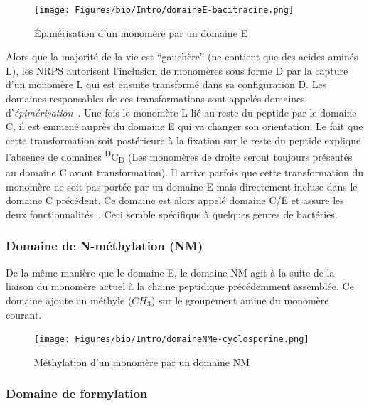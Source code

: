 \begin{figure}[h!]
  \begin{center}
    \texttt{[image: Figures/bio/Intro/domaineE-bacitracine.png]}
    \caption{\label{domaine_E}Épimérisation d'un monomère par un domaine E}
  \end{center}
\end{figure}

Alors que la majorité de la vie est ``gauchère'' (ne contient que des acides aminés L), les NRPS autorisent l'inclusion de monomères sous forme D par la capture d'un monomère L qui est ensuite transformé dans sa configuration D.
Les domaines responsables de ces transformations sont appelés domaines d'\textit{épimérisation}~\cite{calcott_portability_2015}.
Une fois le monomère L lié au reste du peptide par le domaine C, il est emmené auprès du domaine E qui va changer son orientation.
Le fait que cette transformation soit postérieure à la fixation sur le reste du peptide explique l'absence de domaines \textsuperscript{D}C\textsubscript{D} (Les monomères de droite seront toujours présentés au domaine C avant transformation).
Il arrive parfois que cette transformation du monomère ne soit pas portée par un domaine E mais directement incluse dans le domaine C précédent.
Ce domaine est alors appelé domaine C/E et assure les deux fonctionnalités~\cite{yin_enduracidin_2006,balibar_generation_2005}.
Ceci semble spécifique à quelques genres de bactéries.


\subsubsection{Domaine de N-méthylation (NM)}

De la même manière que le domaine E, le domaine NM agit à la suite de la liaison du monomère actuel à la chaine peptidique précédemment assemblée.
Ce domaine ajoute un méthyle ($CH_{3}$) sur le groupement amine du monomère courant.

\begin{figure}[h!]
  \begin{center}
    \texttt{[image: Figures/bio/Intro/domaineNMe-cyclosporine.png]}
    \caption{\label{domaine_NMe}Méthylation d'un monomère par un domaine NM}
  \end{center}
\end{figure}

\subsubsection{Domaine de formylation}

